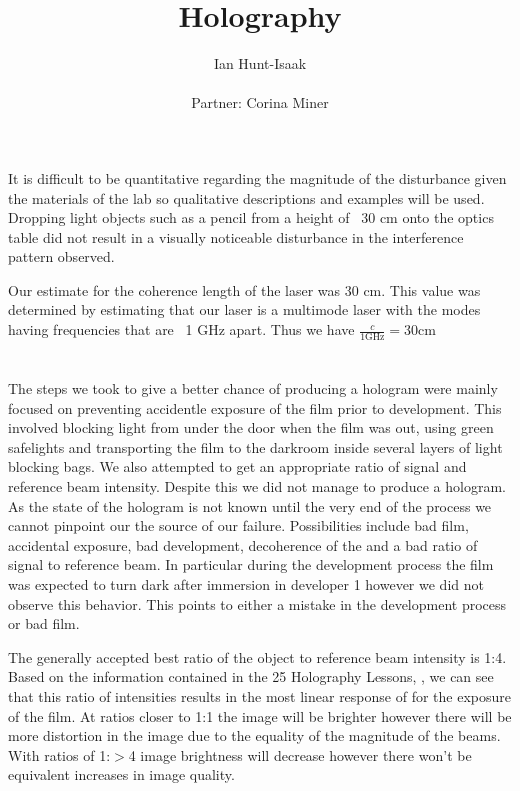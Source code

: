 \documentclass[11pt,letterpaper]{article}
\title{Holography}
\author{Ian Hunt-Isaak\\ \begin{small}
Partner: Corina Miner
\end{small}}
\date{}
\begin{document}
\maketitle
\section{} %
It is difficult to be quantitative regarding the magnitude of the disturbance given the materials of the lab so qualitative descriptions and examples will be used. Dropping light objects such as a pencil from a height of ~30 cm onto the optics table did not result in a visually noticeable disturbance in the interference pattern observed.

Our estimate for the coherence length of the laser was 30 cm. This value was determined by estimating that our laser is a multimode laser with the modes having frequencies that are ~1 GHz apart. Thus we have $\frac{c}{1 \text{GHz}}=30\text{cm}$
\section{} %
The steps we took to give a better chance of producing a hologram were mainly focused on preventing accidentle exposure of the film prior to development. This involved blocking light from under the door when the film was out, using green safelights and transporting the film to the darkroom inside several layers of light blocking bags. We also attempted to get an appropriate ratio of signal and reference beam intensity. Despite this we did not manage to produce a hologram. As the state of the hologram is not known until the very end of the process we cannot pinpoint our the source of our failure. Possibilities include bad film, accidental exposure, bad development, decoherence of the and a bad ratio of signal to reference beam. In particular during the development process the film was expected to turn dark after immersion in developer 1 however we did not observe this behavior. This points to either a mistake in the development process or bad film.

The generally accepted best ratio of the object to reference beam intensity is 1:4. Based on the information contained in the 25 Holography Lessons, \cite{holography.ru}, we can see that this ratio of intensities results in the most linear response of for the exposure of the film. At ratios closer to 1:1 the image will be brighter however there will be more distortion in the image due to the equality of the magnitude of the beams. With ratios of 1:$>$4 image brightness will decrease however there won't be equivalent increases in image quality.
\end{document}

